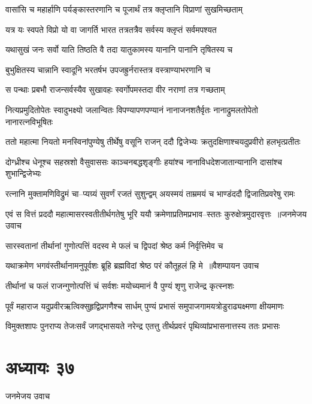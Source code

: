 \twolineshloka
{वासांसि च महार्हाणि पर्यङ्कास्तरणानि च}
{पूजार्थं तत्र क्लृप्तानि विप्राणां सुखमिच्छताम्}


\twolineshloka
{यत्र यः स्वपते विप्रो यो वा जागर्ति भारत}
{तत्रतत्रैव सर्वस्य क्लृप्तं सर्वमपश्यत}


\twolineshloka
{यथासुखं जनः सर्वो याति तिष्ठति वै तदा}
{यातुकामस्य यानानि पानानि तृषितस्य च}


\twolineshloka
{बुभुक्षितस्य चान्नानि स्वादूनि भरतर्षभ}
{उपजह्रुर्नरास्तत्र वस्त्राण्याभरणानि च}


\twolineshloka
{स पन्थाः प्रबभौ राजन्सर्वस्यैव सुखावहः}
{स्वर्गोपमस्तदा वीर नराणां तत्र गच्छताम्}


\threelineshloka
{नित्यप्रमुदितोपेतः स्वादुभक्ष्यो जलान्वितः}
{विपण्यापणपण्यानं नानाजनशतैर्वृतः}
{नानाद्रुमलतोपेतो नानारत्नविभूषितः}


\twolineshloka
{ततो महात्मा नियतो मनस्विनांपुण्येषु तीर्थेषु वसूनि राजन्}
{ददौ द्विजेभ्यः क्रतुदक्षिणाश्चयदुप्रवीरो हलभृत्प्रतीतः}


\twolineshloka
{दोग्ध्रीश्च धेनूश्च सहस्रशो वैसुवाससः काञ्चनबद्धशृङ्गीः}
{हयांश्च नानाविधदेशजातान्यानानि दासांश्च शुभान्द्विजेभ्यः}


\twolineshloka
{रत्नानि मुक्तामणिविद्रुमं चा--प्यग्र्यं सुवर्णं रजतं सुशुन्द्वम्}
{अयस्मयं ताम्रमयं च भाण्डंददौ द्विजातिप्रवरेषु रामः}


\threelineshloka
{एवं स वित्तं प्रददौ महात्मासरस्वतीतीर्थगतेषु भूरि}
{ययौ क्रमेणाप्रतिमप्रभाव--स्ततः कुरुक्षेत्रमुदारवृत्तः ॥जनमेजय उवाच}
{}


\twolineshloka
{सारस्वतानां तीर्थानां गुणोत्पत्तिं वदस्व मे}
{फलं च द्विपदां श्रेष्ठ कर्म निर्वृत्तिमेव च}


\threelineshloka
{यथाक्रमेण भगवंस्तीर्थानामनुपूर्वशः}
{ब्रूहि ब्रह्मविदां श्रेष्ठ परं कौतूहलं हि मे ॥वैशम्पायन उवाच}
{}


\twolineshloka
{तीर्थानां च फलं राजन्गुणोत्पत्तिं चं सर्वशः}
{मयोच्यमानं वै पुण्यं शृणु राजेन्द्र कृत्स्नशः}


\twolineshloka
{पूर्वं महाराज यदुप्रवीरऋत्विक्सुहृद्विप्रगणैश्च सार्धम्}
{पुण्यं प्रभासं समुपाजगामयत्रोडुराढ्यक्ष्मणा क्षीयमाणः}


\twolineshloka
{विमुक्तशापः पुनराप्य तेजःसर्वं जगद्भासयते नरेन्द्र}
{एतत्तु तीर्थप्रवरं पृथिव्यांप्रभासनात्तस्य ततः प्रभासः}


\chapter{अध्यायः ३७}
\twolineshloka
{जनमेजय उवाच}
{}


